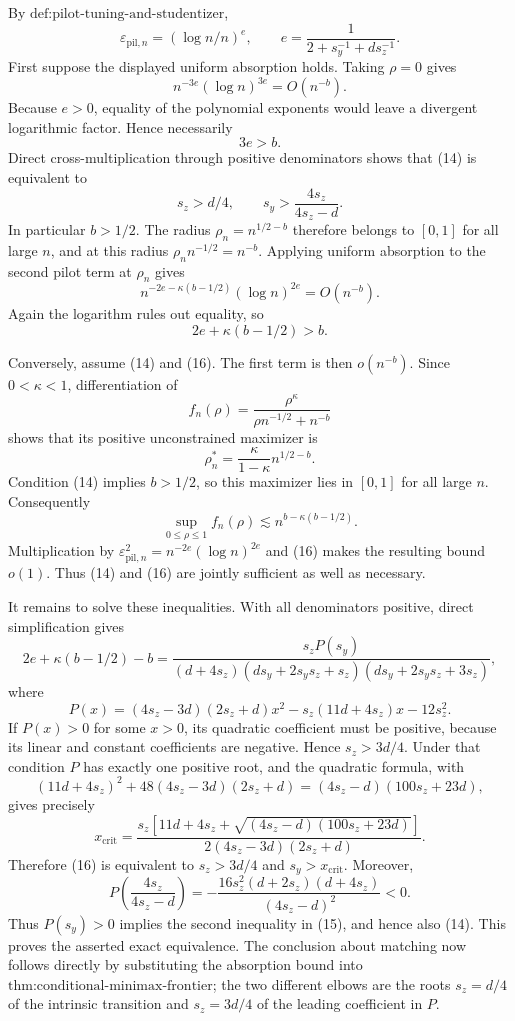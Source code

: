 By \(\text{def:pilot-tuning-and-studentizer}\),
\[
\varepsilon_{\mathrm{pil},n}=(\log n/n)^e,
\qquad
e=\frac{1}{2+s_y^{-1}+d s_z^{-1}}.
\]
First suppose the displayed uniform absorption holds.  Taking \(\rho=0\) gives
\[
n^{-3e}(\log n)^{3e}=O(n^{-b}).
\]
Because \(e>0\), equality of the polynomial exponents would leave a divergent logarithmic factor.  Hence necessarily
\[
3e>b. \tag{14}
\]
Direct cross-multiplication through positive denominators shows that (14) is equivalent to
\[
s_z>d/4,
\qquad
s_y>\frac{4s_z}{4s_z-d}. \tag{15}
\]
In particular \(b>1/2\).  The radius \(\rho_n=n^{1/2-b}\) therefore belongs to \([0,1]\) for all large \(n\), and at this radius
\(\rho_n n^{-1/2}=n^{-b}\).  Applying uniform absorption to the second pilot term at \(\rho_n\) gives
\[
n^{-2e-\kappa(b-1/2)}(\log n)^{2e}=O(n^{-b}).
\]
Again the logarithm rules out equality, so
\[
2e+\kappa(b-1/2)>b. \tag{16}
\]

Conversely, assume (14) and (16).  The first term is then \(o(n^{-b})\).  Since \(0<\kappa<1\), differentiation of
\[
f_n(\rho)=\frac{\rho^\kappa}{\rho n^{-1/2}+n^{-b}}
\]
shows that its positive unconstrained maximizer is
\[
\rho_n^*=\frac{\kappa}{1-\kappa}n^{1/2-b}.
\]
Condition (14) implies \(b>1/2\), so this maximizer lies in \([0,1]\) for all large \(n\).  Consequently
\[
\sup_{0\le\rho\le1}f_n(\rho)
\lesssim n^{b-\kappa(b-1/2)}.
\]
Multiplication by \(\varepsilon_{\mathrm{pil},n}^2=n^{-2e}(\log n)^{2e}\) and (16) makes the resulting bound \(o(1)\).  Thus (14) and (16) are jointly sufficient as well as necessary.

It remains to solve these inequalities.  With all denominators positive, direct simplification gives
\[
2e+\kappa(b-1/2)-b
=\frac{s_z P(s_y)}
{(d+4s_z)(d s_y+2s_ys_z+s_z)(d s_y+2s_ys_z+3s_z)}, \tag{17}
\]
where
\[
P(x)=(4s_z-3d)(2s_z+d)x^2-s_z(11d+4s_z)x-12s_z^2.
\]
If \(P(x)>0\) for some \(x>0\), its quadratic coefficient must be positive, because its linear and constant coefficients are negative.  Hence \(s_z>3d/4\).  Under that condition \(P\) has exactly one positive root, and the quadratic formula, with
\[
(11d+4s_z)^2+48(4s_z-3d)(2s_z+d)
=(4s_z-d)(100s_z+23d),
\]
gives precisely
\[
x_{\mathrm{crit}}=
\frac{s_z\!\left[11d+4s_z+\sqrt{(4s_z-d)(100s_z+23d)}\right]}
{2(4s_z-3d)(2s_z+d)}.
\]
Therefore (16) is equivalent to \(s_z>3d/4\) and \(s_y>x_{\mathrm{crit}}\).  Moreover,
\[
P\!\left(\frac{4s_z}{4s_z-d}\right)
=-\frac{16s_z^2(d+2s_z)(d+4s_z)}{(4s_z-d)^2}<0.
\]
Thus \(P(s_y)>0\) implies the second inequality in (15), and hence also (14).  This proves the asserted exact equivalence.  The conclusion about matching now follows directly by substituting the absorption bound into \(\text{thm:conditional-minimax-frontier}\); the two different elbows are the roots \(s_z=d/4\) of the intrinsic transition and \(s_z=3d/4\) of the leading coefficient in \(P\).

